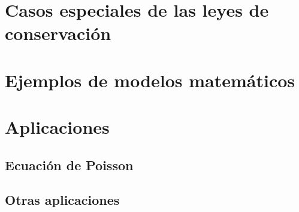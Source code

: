 \section{Casos especiales de las leyes de conservación}

\section{Ejemplos de modelos matemáticos}


\section{Aplicaciones}
\subsection{Ecuación de Poisson}
\subsection{Otras aplicaciones}